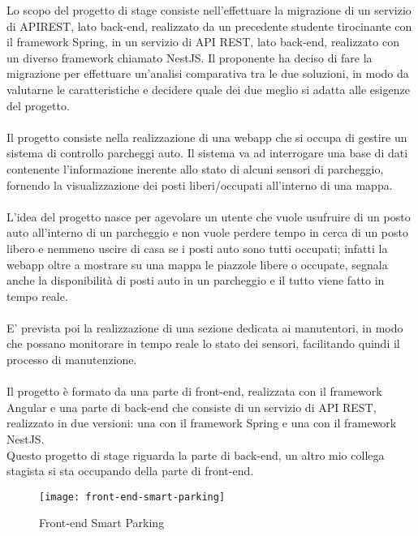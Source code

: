 Lo scopo del progetto di stage consiste nell'effettuare la migrazione di un servizio di
\gls{API}\glsfirstoccur \gls{REST}\glsfirstoccur, lato back-end, realizzato da un precedente studente tirocinante con il framework
Spring, in un servizio di \gls{API} \gls{REST}, lato \gls{back-end}\glsfirstoccur, realizzato con un diverso framework chiamato
NestJS. Il proponente ha deciso di fare la migrazione per effettuare un'analisi comparativa tra le due soluzioni, in
modo da valutarne le caratteristiche e decidere quale dei due meglio si adatta alle esigenze
del progetto.
\\\\
Il progetto consiste nella realizzazione di una webapp che si occupa di gestire un sistema
di controllo parcheggi auto. Il sistema va ad interrogare una base di dati contenente
l'informazione inerente allo stato di alcuni sensori di parcheggio, fornendo la visualizzazione
dei posti liberi/occupati all'interno di una mappa.
\\\\
L'idea del progetto nasce per agevolare un utente che vuole usufruire di un posto auto all'interno di 
un parcheggio e non vuole perdere tempo in cerca di un posto libero e nemmeno uscire di casa se i posti auto
sono tutti occupati; infatti la webapp oltre a mostrare su una mappa le piazzole libere o occupate, segnala 
anche la disponibilità di posti auto in un parcheggio e il tutto viene fatto in tempo reale.
\\\\
E' prevista poi la realizzazione di una sezione dedicata ai manutentori, in modo che possano monitorare
in tempo reale lo stato dei sensori, facilitando quindi il processo di manutenzione.
\\\\
Il progetto è formato da una parte di \gls{front-end}\glsfirstoccur, realizzata con il framework Angular e una 
parte di \gls{back-end} che consiste di un servizio di \gls{API} \gls{REST}, realizzato in due versioni: una 
con il framework Spring e una con il framework NestJS.
\\
Questo progetto di stage riguarda la parte di \gls{back-end}, un altro mio collega stagista si sta occupando
della parte di \gls{front-end}.
\clearpage
\begin{figure}[H]
    \centering
    \texttt{[image: front-end-smart-parking]}
    \caption{Front-end Smart Parking}
\end{figure}

